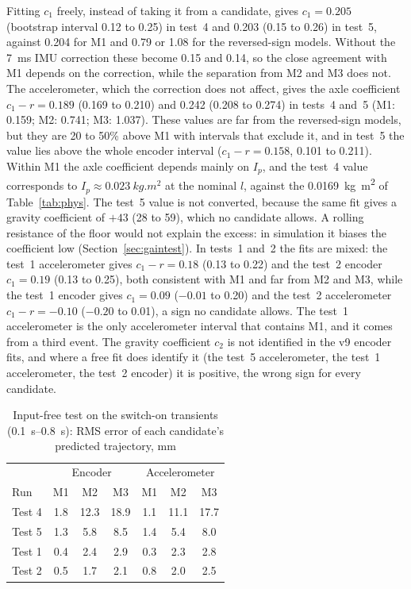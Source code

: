 Fitting $c_1$ freely, instead of taking it from a candidate, gives $c_1=0.205$
(bootstrap interval 0.12 to 0.25) in test~4 and 0.203 (0.15 to 0.26) in test~5,
against 0.204 for M1 and 0.79 or 1.08 for the reversed-sign models. Without the
\SI{7}{ms} IMU correction these become 0.15 and 0.14, so the close agreement
with M1 depends on the correction, while the separation from M2 and M3 does
not. The accelerometer, which the correction does not affect, gives the axle
coefficient $c_1-r=0.189$ (0.169 to 0.210) and 0.242 (0.208 to 0.274) in
tests~4 and~5 (M1: 0.159; M2: 0.741; M3: 1.037). These values are far from
the reversed-sign models, but they are 20 to 50\% above M1 with intervals that
exclude it, and in test~5 the value lies above the whole encoder interval
($c_1-r=0.158$, 0.101 to 0.211). Within M1 the axle coefficient depends mainly
on $I_p$, and the test~4 value corresponds to $I_p\approx\SI{0.023}{kg.m^2}$ at
the nominal $l$, against the \SI{0.0169}{kg.m^2} of Table~\ref{tab:phys}. The
test~5 value is not converted, because the same fit gives a gravity coefficient
of $+43$ (28 to 59), which no candidate allows. A rolling resistance of the
floor would not explain the excess: in simulation it biases the coefficient low
(Section~\ref{sec:gaintest}). In tests~1 and~2 the fits are mixed: the test~1
accelerometer gives $c_1-r=0.18$ (0.13 to 0.22) and the test~2 encoder
$c_1=0.19$ (0.13 to 0.25), both consistent with M1 and far from M2 and M3,
while the test~1 encoder gives $c_1=0.09$ ($-0.01$ to 0.20) and the test~2
accelerometer $c_1-r=-0.10$ ($-0.20$ to 0.01), a sign no candidate allows. The
test~1 accelerometer is the only accelerometer interval that contains M1, and
it comes from a third event. The gravity coefficient $c_2$ is not identified in
the v9 encoder fits, and where a free fit does identify it (the test~5
accelerometer, the test~1 accelerometer, the test~2 encoder) it is positive,
the wrong sign for every candidate.

\begin{table}[htbp]
\centering
\caption{Input-free test on the switch-on transients (\SIrange{0.1}{0.8}{s}):
RMS error of each candidate's predicted trajectory, \si{mm}}
\label{tab:momtest}
\begin{tabular}{lccc@{\qquad}ccc}
\toprule
 & \multicolumn{3}{c}{Encoder} & \multicolumn{3}{c}{Accelerometer} \\
Run & M1 & M2 & M3 & M1 & M2 & M3 \\
\midrule
Test 4 & 1.8 & 12.3 & 18.9 & 1.1 & 11.1 & 17.7 \\
Test 5 & 1.3 & 5.8 & 8.5 & 1.4 & 5.4 & 8.0 \\
Test 1 & 0.4 & 2.4 & 2.9 & 0.3 & 2.3 & 2.8 \\
Test 2 & 0.5 & 1.7 & 2.1 & 0.8 & 2.0 & 2.5 \\
\bottomrule
\end{tabular}
\end{table}

